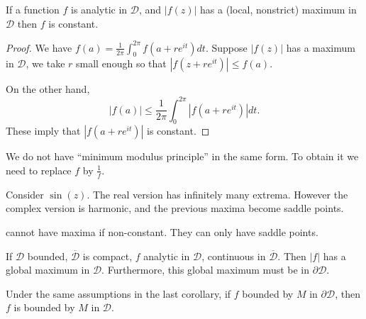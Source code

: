 \begin{theorem}
	If a function $f$ is analytic in $\mathcal{D}$, and $|f(z)|$ has a (local, nonstrict) maximum in $\mathcal{D}$ then $f$ is constant.
\end{theorem}
\begin{proof}
	We have $f(a) = \frac{1}{2 \pi}\int _0^{2 \pi} f(a + r e^{i t})d t$. Suppose $|f(z)|$ has a maximum in $\mathcal{D}$, we take $r  $ small enough so that $|f(z+re^{it })| \le f(a)$.

	On the other hand, \[
		|f(a)| \le  \frac{1}{2 \pi} \int _0^{2 \pi} |f(a + r e^{i t})|d t
	.\] 
	These imply that $|f(a + r e^{i t})|$ is constant.
\end{proof}
We do not have ``minimum modulus principle'' in the same form. To obtain it we need to replace $f$ by $\frac{1}{f}$.

\begin{example}
	Consider $\sin(z)$. The real version has infinitely many extrema. However the complex version is harmonic, and the previous maxima become saddle points. 

	 cannot have maxima if non-constant. They can only have saddle points.
\end{example}

\begin{corollary}
	If $\mathcal{D}$ bounded, $\overline{\mathcal{D}} $ is compact, $f$ analytic in $\mathcal{D}$, continuous in $\overline{\mathcal{D}} $. Then $|f|$ has a global maximum in $\mathcal{D}$. Furthermore, this global maximum must be in $\partial \mathcal{D}$.
\end{corollary}

\begin{corollary}
	Under the same assumptions in the last corollary, if $f$ bounded by $M$ in $\partial \mathcal{D}$, then $f$ is bounded by $M$ in $\mathcal{D}$.
\end{corollary}
